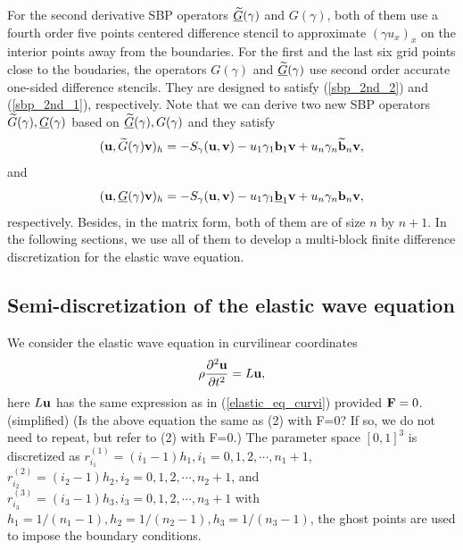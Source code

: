 \documentclass[a4paper]{article}
\newcommand{\wt}{\widetilde}
\begin{document}
For the second derivative SBP operators $\uline{\wt{G}}(\gamma)$ and $G(\gamma)$, both of them use a fourth order five points centered difference stencil to approximate $(\gamma u_x)_x$ on the interior points away from the boundaries. For the first and the last six grid points close to the boudaries, the operators $G(\gamma)$ and $\uline{\wt{G}}(\gamma)$ use second order accurate one-sided difference stencils. They are designed to satisfy (\ref{sbp_2nd_2}) and (\ref{sbp_2nd_1}), respectively.  Note that we can derive two new SBP operators $\wt{G}(\gamma), \uline{G}(\gamma)$ based on $\uline{\wt{G}}(\gamma), G(\gamma)$ and they satisfy
\begin{equation}\label{sbp_2nd_3}
({\bf u}, \wt{G}(\gamma){\bf v})_h = -S_\gamma({\bf u},{\bf v})-u_1\gamma_1{\bf b}_1{\bf v} + u_n\gamma_n\wt{{\bf b}}_n{\bf v},
\end{equation}
and
\begin{equation}\label{sbp_2nd_4}
({\bf u}, \uline{G}(\gamma){\bf v})_h = -S_\gamma({\bf u},{\bf v})-u_1\gamma_1\uline{{\bf b}}_1{\bf v} + u_n\gamma_n{\bf b}_n{\bf v},
\end{equation}
respectively. Besides, in the matrix form, both of them are of size $n$ by $n+1$. In the following sections, we use all of them to develop a multi-block finite difference discretization for the elastic wave equation. 

\subsection{Semi-discretization of the elastic wave equation}

We consider the elastic wave equation in curvilinear coordinates 
\begin{equation}\label{elastic_equation}
\rho\frac{\partial^2 {\bf u}}{\partial t^2} = L{\bf u},
\end{equation}
here $L{\bf u}$ has the same expression as in (\ref{elastic_eq_curvi}) provided ${\bf F} = 0$. {\color{blue} (simplified)}
{\color{red}(Is the above equation the same as (2) with F=0? If so, we do not need to repeat, but refer to (2) with F=0.)} The parameter space $[0,1]^3$ is discretized as $r_{i_1}^{(1)} = (i_1-1)h_1, i_1 = 0,1,2,\cdots,n_1+1$, $r_{i_2}^{(2)} = (i_2-1)h_2, i_2 = 0,1,2,\cdots,n_2+1$, and $r_{i_3}^{(3)} = (i_3-1)h_3, i_3 = 0,1,2,\cdots,n_3+1$ with $h_1 = 1/(n_1-1), h_2 = 1/(n_2-1), h_3 = 1/(n_3-1)$, the ghost points are used to impose the boundary conditions.
\end{document}
